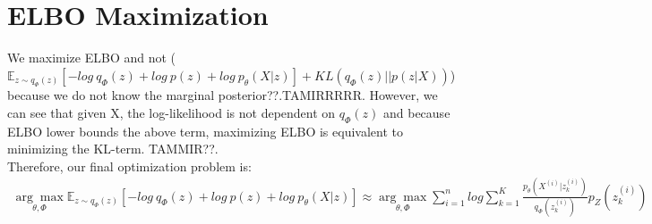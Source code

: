\section*{ELBO Maximization}
We maximize ELBO and not ($\mathbb{E}_{z \sim q_{\Phi}(z)}[-log \ q_{\Phi}(z) + log \ p(z) + log \ p_{\theta}(X|z)]+KL(q_{\Phi}(z)||p(z|X))$) because we do not know the marginal posterior??.TAMIRRRRR. However, we can see that given X, the log-likelihood is not dependent on $q_{\Phi}(z)$ and because ELBO lower bounds the above term, maximizing ELBO is equivalent to minimizing the KL-term. TAMMIR??.\\
Therefore, our final optimization problem is: 
\begin{gather*}
\underset{\theta, \Phi}{\arg\max} \mathbb{E}_{z \sim q_{\Phi}(z)}[-log \ q_{\Phi}(z) + log \ p(z) + log \ p_{\theta}(X|z)] \approx \underset{\theta, \Phi}{\arg\max} \sum_{i=1}^{n}log \sum_{k=1}^{K}\frac{p_{\theta}(X^{(i)}|z_{k}^{(i)})}{q_{\Phi}(z_{k}^{(i)})}p_{Z}(z_{k}^{(i)})\\
\end{gather*}
